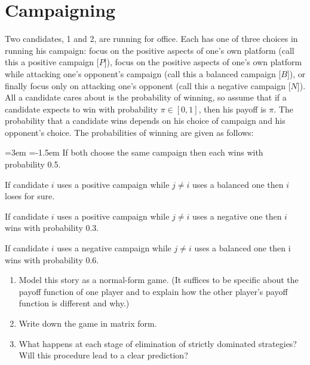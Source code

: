 \documentclass[12pt,a4paper]{article}
\begin{document}
\section{Campaigning}
Two candidates, 1 and 2, are running for office. Each has one of three choices in running his campaign: focus on the positive aspects of one’s own platform (call this a positive campaign [$P$]), focus on the positive aspects of one’s own platform while attacking one’s opponent’s campaign (call this a balanced campaign [$B$]), or finally focus only on attacking one’s opponent (call this a negative campaign [$N$]). All a candidate cares about is the probability of winning, so assume that if a candidate expects to win with probability $\pi \in [0, 1]$, then his payoff is $\pi$. The probability that a candidate wins depends on his choice of campaign and his opponent’s choice. The probabilities of winning are given as follows:

\vspace{0.3cm}

{\leftskip=3em
\parindent=-1.5em
If both choose the same campaign then each wins with probability 0.5.

If candidate $i$ uses a positive campaign while $j \neq i$ uses a balanced one then $i$ loses for sure.

If candidate $i$ uses a positive campaign while $j \neq i$ uses a negative one then $i$ wins with probability 0.3.

If candidate $i$ uses a negative campaign while $j \neq i$ uses a balanced one then i wins with probability 0.6.

}

\vspace{0.3cm}

\begin{enumerate}[label=(\alph*)]
  \item Model this story as a normal-form game. (It suffices to be specific about the payoff function of one player and to explain how the other player’s payoff function is different and why.)
  \item Write down the game in matrix form.
  \item What happens at each stage of elimination of strictly dominated strategies? Will this procedure lead to a clear prediction?
\end{enumerate}

\vspace{0.5cm}
\end{document}
